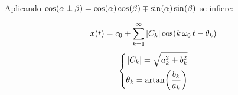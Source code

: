 Aplicando $\fx[\cos]{\alpha \pm \beta} = \fx[\cos]{\alpha} \fx[\cos]{\beta} \mp \fx[\sin]{\alpha} \fx[\sin]{\beta}$ se infiere:

\begin{mdframed}[style=DefinitionFrame]
    \begin{defn}
        \label{defn:FourierSerieArm}
    \end{defn}
    \begin{equation*}
        \fx[x]{t} = c_0 + \sum_{\kth=1}^{\infty} \norm{C_\kth} \fx[\cos]{\kth \, \omega_0 \, t - \theta_\kth}
    \end{equation*}
    \begin{equation*}
    \left\{
    \begin{aligned}
        \norm{C_\kth} = \sqrt{a_\kth^2 + b_\kth^2}
        \\
        \theta_\kth = \fx[\artan]{\frac{b_\kth}{a_\kth}}
    \end{aligned}
    \right.
\end{equation*}
\end{mdframed}

